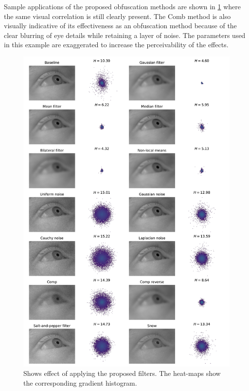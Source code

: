 Sample applications of the proposed obfuscation methods are shown in \cref{fig:filters} where the same visual correlation is still clearly present. The Comb method is also visually indicative of its effectiveness as an obfuscation method because of the clear blurring of eye details while retaining a layer of noise. The parameters used in this example are exaggerated to increase the perceivability of the effects.

\begin{figure}
    \centering
    \includegraphics[width=0.85\linewidth]{figures/results/filter_effect.pdf}
    \caption{Shows effect of applying the proposed filters. The heat-maps show the corresponding gradient histogram.}
    \label{fig:filters}
\end{figure}



